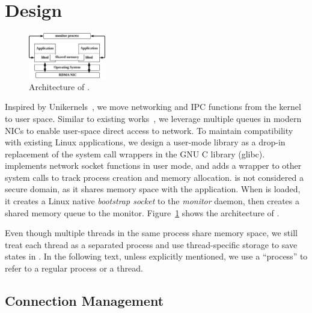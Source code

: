 \section{Design}
\label{sec:intra-server}


\begin{figure}[t]
	\centering
	\includegraphics[width=0.3\textwidth]{images/architecture}
	\caption{Architecture of \sys{}.}
	\label{fig:architecture}
\end{figure}


Inspired by Unikernels~\cite{madhavapeddy2013unikernels}, we move networking and IPC functions from the kernel to user space. Similar to existing works~\cite{peter2016arrakis,jeong2014mtcp,libvma}, we leverage multiple queues in modern NICs to enable user-space direct access to network. %
To maintain compatibility with existing Linux applications, we design a user-mode library \libipc as a drop-in replacement of the system call wrappers in the GNU C library (glibc). \libipc{} implements network socket functions in user mode, and adds a wrapper to other system calls to track process creation and memory allocation. \libipc{} is not considered a secure domain, as it shares memory space with the application. When \libipc{} is loaded, it creates a Linux native \textit{bootstrap socket} to the \textit{monitor} daemon, then creates a shared memory queue to the monitor. Figure~\ref{fig:architecture} shows the architecture of \sys{}.

Even though multiple threads in the same process share memory space, we still treat each thread as a separated process and use thread-specific storage to save states in \libipc. In the following text, unless explicitly mentioned, we use a ``process'' to refer to a regular process or a thread.

\subsection{Connection Management}
\label{subsec:socket-api}



